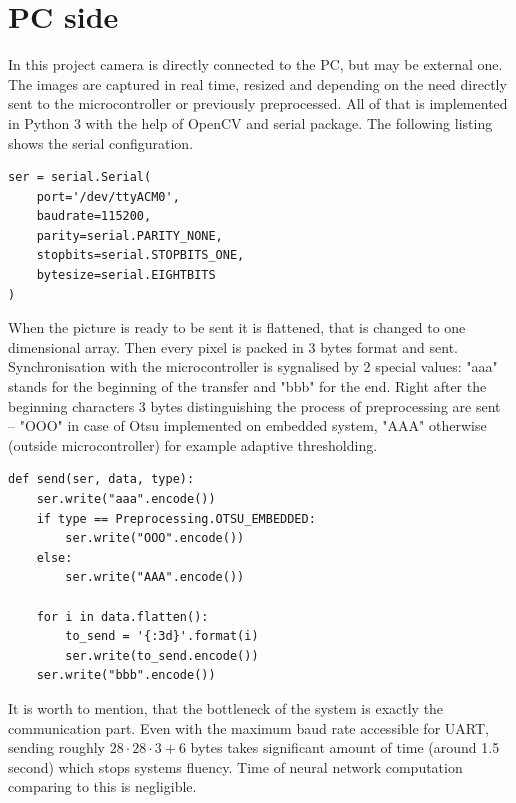 \begingroup
\renewcommand{\cleardoublepage}{}
\renewcommand{\clearpage}{}
\chapter{PC side}
\endgroup
In this project camera is directly connected to the PC, but may be external one. The images are captured in real time, resized and depending on the need directly sent to the microcontroller or previously preprocessed. All of that is implemented in Python 3 with the help of OpenCV and serial package. The following listing shows the serial configuration.
\begin{verbatim}
ser = serial.Serial(
    port='/dev/ttyACM0',
    baudrate=115200,
    parity=serial.PARITY_NONE,
    stopbits=serial.STOPBITS_ONE,
    bytesize=serial.EIGHTBITS
)
\end{verbatim}
When the picture is ready to be sent it is flattened, that is changed to one dimensional array. Then every pixel is packed in 3 bytes format and sent. Synchronisation with the microcontroller is sygnalised by 2 special values: "aaa" stands for the beginning of the transfer and "bbb" for the end. Right after the beginning characters 3 bytes distinguishing the process of preprocessing are sent -- "OOO" in case of Otsu implemented on embedded system, "AAA" otherwise (outside microcontroller) for example adaptive thresholding. 
\begin{verbatim}
def send(ser, data, type):
    ser.write("aaa".encode())
    if type == Preprocessing.OTSU_EMBEDDED:
        ser.write("OOO".encode())
    else:
        ser.write("AAA".encode())

    for i in data.flatten():
        to_send = '{:3d}'.format(i)
        ser.write(to_send.encode())
    ser.write("bbb".encode())
\end{verbatim}
It is worth to mention, that the bottleneck of the system is exactly the communication part. Even with the maximum baud rate accessible for UART, sending roughly $28\cdot28\cdot3 + 6$ bytes takes significant amount of time (around \num{1.5} second) which stops systems fluency. Time of neural network computation comparing to this is negligible. 

\begingroup
\renewcommand{\cleardoublepage}{}
\renewcommand{\clearpage}{}

